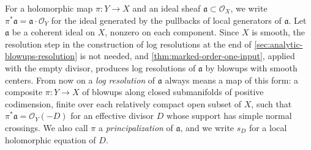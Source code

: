 For a holomorphic map $\pi\colon Y\to X$ and an ideal sheaf $\mathfrak a\subset\mathcal O_X$, we write $\pi^*\mathfrak a=\mathfrak a\cdot\mathcal O_Y$ for the ideal generated by the pullbacks of local generators of $\mathfrak a$. Let $\mathfrak a$ be a coherent ideal on $X$, nonzero on each component. Since $X$ is smooth, the resolution step in the construction of log resolutions at the end of \cref{sec:analytic-blowups-resolution} is not needed, and \cref{thm:marked-order-one-input}, applied with the empty divisor, produces log resolutions of $\mathfrak a$ by blowups with smooth centers. From now on a \emph{log resolution} of $\mathfrak a$ always means a map of this form: a composite $\pi\colon Y\to X$ of blowups along closed submanifolds of positive codimension, finite over each relatively compact open subset of $X$, such that $\pi^*\mathfrak a=\mathcal O_Y(-D)$ for an effective divisor $D$ whose support has simple normal crossings. We also call $\pi$ a \emph{principalization} of $\mathfrak a$, and we write $s_D$ for a local holomorphic equation of $D$.

